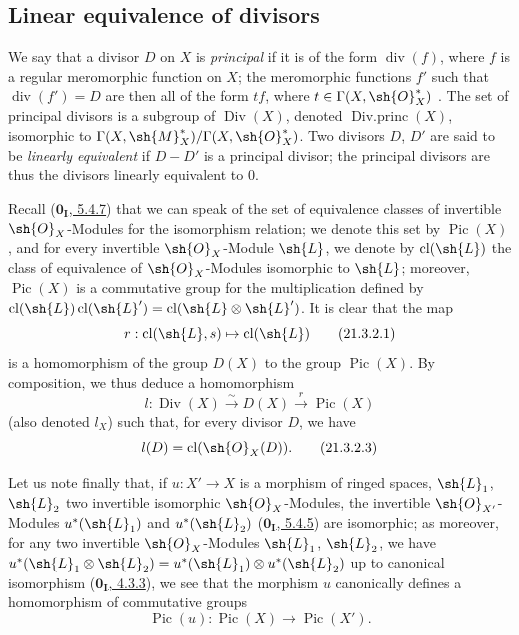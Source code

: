 \subsection{Linear equivalence of divisors}
\label{subsection:IV.21.3}

\begin{env}[21.3.1]
\label{IV.21.3.1}
We say that a divisor $D$ on $X$ is \emph{principal} if it is of the form $\operatorname{div}(f)$, where $f$ is a regular meromorphic function on $X$;
the meromorphic functions $f'$ such that $\operatorname{div}(f')=D$ are then all of the form $tf$, where $t\in\Gamma(X,\sh{O}_X^*)$ .
The set of principal divisors is a subgroup of $\operatorname{Div}(X)$, denoted $\operatorname{Div.princ}(X)$, isomorphic to $\Gamma(X,\sh{M}_X^*)/\Gamma(X,\sh{O}_X^*)$.
Two divisors $D$, $D'$ are said to be \emph{linearly equivalent} if $D-D'$ is a principal divisor;
the principal divisors are thus the divisors linearly equivalent to $0$.
\end{env}


\begin{env}[21.3.2]
\label{IV.21.3.2}
Recall (\hyperref[0.5.4.7]{$\mathbf{0_I}$, 5.4.7}) that we can speak of the set of equivalence classes of invertible $\sh{O}_X$-Modules for the isomorphism relation;
we denote this set by $\operatorname{Pic}(X)$, and for every invertible $\sh{O}_X$-Module $\sh{L}$, we denote by $\operatorname{cl}(\sh{L})$ the class of equivalence of $\sh{O}_X$-Modules isomorphic to $\sh{L}$;
moreover, $\operatorname{Pic}(X)$ is a commutative group for the multiplication defined by $\operatorname{cl}(\sh{L})\operatorname{cl}(\sh{L}')=\operatorname{cl}(\sh{L}\otimes\sh{L}')$.
It is clear that the map
\[
\label{IV.21.3.2.1}
  r:\operatorname{cl}(\sh{L},s)\mapsto\operatorname{cl}(\sh{L})
  \tag{21.3.2.1}
\]
is a homomorphism of the group $D(X)$  to the group $\operatorname{Pic}(X)$.
By composition, we thus deduce a homomorphism
\[
\label{IV.21.3.2.2}
  l:\operatorname{Div}(X)\xrightarrow{\sim}D(X)\xrightarrow{r}\operatorname{Pic}(X)
  \tag{21.3.2.2}
\]
(also denoted $l_X$) such that, for every divisor $D$, we have
\[
\label{IV.21.3.2.3}
  l(D)=\operatorname{cl}(\sh{O}_X(D)).
  \tag{21.3.2.3}
\]

Let us note finally that, if $u:X'\to X$ is a morphism of ringed spaces, $\sh{L}_1$, $\sh{L}_2$ two invertible isomorphic $\sh{O}_X$-Modules, the invertible $\sh{O}_{X'}$-Modules $u^*(\sh{L}_1)$ and $u^*(\sh{L}_2)$ (\hyperref[0.5.4.5]{$\mathbf{0_I}$, 5.4.5}) are isomorphic;
as moreover, for any two invertible $\sh{O}_X$-Modules $\sh{L}_1$, $\sh{L}_2$, we have $u^*(\sh{L}_1\otimes\sh{L}_2)=u^*(\sh{L}_1)\otimes u^*(\sh{L}_2)$ up to canonical isomorphism (\hyperref[0.4.3.3]{$\mathbf{0_I}$, 4.3.3}), we see that the morphism $u$ canonically defines a homomorphism of commutative groups
\[
\label{IV.21.3.2.4}
  \operatorname{Pic}(u):\operatorname{Pic}(X)\to\operatorname{Pic}(X').
  \tag{21.3.2.4}
\]
\end{env}

